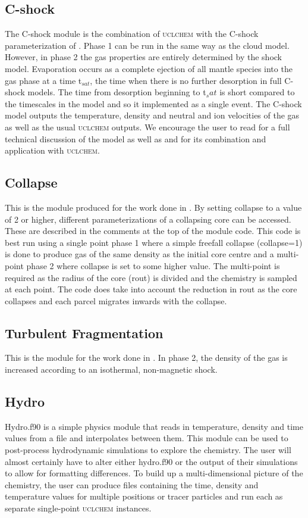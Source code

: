 \documentclass{llncs}
\begin{document}
\subsection{C-shock}
The C-shock module is the combination of \textsc{uclchem} with the C-shock parameterization of \citet{jimenez2008}. Phase 1 can be run in the same way as the cloud model. However, in phase 2 the gas properties are entirely determined by the shock model. Evaporation occurs as a complete ejection of all mantle species into the gas phase at a time t$_{sat}$, the time when there is no further desorption in full C-shock models. The time from desorption beginning to t$_sat$ is short compared to the timescales in the model and so it implemented as a single event. The C-shock model outputs the temperature, density and neutral and ion velocities of the gas as well as the usual \textsc{uclchem} outputs. We encourage the user to read \citet{jimenez2008} for a full technical discussion of the model as well as \citet{viti2011} and \citet{Holdship2016b} for its combination and application with \textsc{uclchem}.
%
\subsection{Collapse}
This is the module produced for the work done in \citet{Priestley2018}. By setting collapse to a value of 2 or higher, different parameterizations of a collapsing core can be accessed. These are described in the comments at the top of the module code. This code is best run using a single point phase 1 where a simple freefall collapse (collapse=1) is done to produce gas of the same density as the initial core centre and a multi-point phase 2 where collapse is set to some higher value. The multi-point is required as the radius of the core (rout) is divided and the chemistry is sampled at each point. The code does take into account the reduction in rout as the core collapses and each parcel migrates inwards with the collapse.
%
\subsection{Turbulent Fragmentation}
This is the module for the work done in \citet{Holdship2015}. In phase 2, the density of the gas is increased according to an isothermal, non-magnetic shock. 
%
\subsection{Hydro}
Hydro.f90 is a simple physics module that reads in temperature, density and time values from a file and interpolates between them. This module can be used to post-process hydrodynamic simulations to explore the chemistry. The user will almost certainly have to alter either hydro.f90 or the output of their simulations to allow for formatting differences. To build up a multi-dimensional picture of the chemistry, the user can produce files containing the time, density and temperature values for multiple positions or tracer particles and run each as separate single-point \textsc{\textsc{uclchem}} instances.
\end{document}
